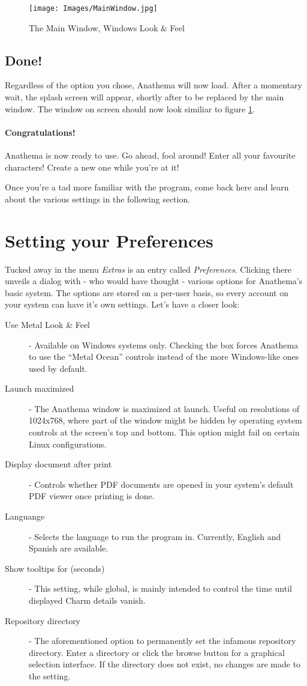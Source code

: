 \begin{figure}[htb]
	\centering
		\texttt{[image: Images/MainWindow.jpg]}
	\caption{The Main Window, Windows Look \& Feel}
	\label{fig:MainWindow}
\end{figure}

\subsection{Done!}
Regardless of the option you chose, Anathema will now load. After a momentary wait, the splash screen will appear, shortly after to be replaced by the main window. The window on screen should now look similiar to figure \ref{fig:MainWindow}.

\paragraph{Congratulations!} Anathema is now ready to use. Go ahead, fool around! Enter all your favourite characters! Create a new one while you're at it!
\medskip

Once you're a tad more familiar with the program, come back here and learn about the various settings in the following section.

\section{Setting your Preferences}\label{sec:Preferences}
Tucked away in the menu \emph{Extras} is an entry called \emph{Preferences}. Clicking there unveils a dialog with - who would have thought - various options for Anathema's basic system. The options are stored on a per-user basis, so every account on your system can have it's own settings. Let's have a closer look:
\begin{description}
	\item[Use Metal Look \& Feel] - Available on Windows systems only. Checking the box forces Anathema to use the ``Metal Ocean'' controls instead of the more Windows-like ones used by default.
	\item[Launch maximized] - The Anathema window is maximized at launch. Useful on resolutions of 1024x768, where part of the window might be hidden by operating system controls at the screen's top and bottom. This option might fail on certain Linux configurations.
	\item[Display document after print] - Controls whether PDF documents are opened in your system's default PDF viewer once printing is done.
	\item[Languange] - Selects the language to run the program in. Currently, English and Spanish are available.
	\item[Show tooltips for (seconds)] - This setting, while global, is mainly intended to control the time until displayed Charm details vanish. 
	\item[Repository directory] - The aforementioned option to permanently set the infamous repository directory. Enter a directory or click the browse button for a graphical selection interface. If the directory does not exist, no changes are made to the setting.
\end{description}
	
